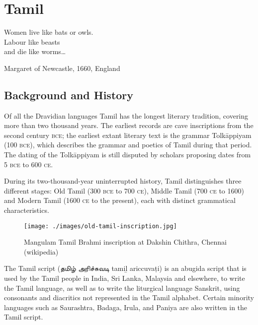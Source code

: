 \chapter{Tamil}

\epigraph{Women live like bats or owls.\\Labour like beasts\\and die like worms\ldots}{Margaret of Newcastle, 1660, England}



\label{s:tamil}
\newfontfamily{}

\def\tamiltext#1{{\tamil#1}}

\section{Background and History}

Of all the Dravidian languages Tamil has the longest literary tradition, covering
more than two thousand years. The earliest records are cave inscriptions from
the second century \textsc{bce}; the earliest extant literary text is the grammar
Tolkāppiyam (100 \textsc{bce}), which describes the grammar and poetics of Tamil during
that period. The dating of the Tolkāppiyam is still disputed by scholars proposing dates from
5 \textsc{bce} to 600 \textsc{ce}. 

During its two-thousand-year uninterrupted history, Tamil distinguishes
three different stages: Old Tamil (300 \textsc{bce} to 700 \textsc{ce}), Middle Tamil (700
\textsc{ce} to 1600) and Modern Tamil (1600 \textsc{ce} to the present), each with distinct
grammatical characteristics.


\begin{figure}[htbp]
\bgroup
\parindent=0pt
\centering
\texttt{[image: ./images/old-tamil-inscription.jpg]}

\caption{Mangulam Tamil Brahmi inscription at Dakshin Chithra, Chennai (wikipedia)}

\egroup
\end{figure}

The Tamil script (\tamiltext{தமிழ் அரிச்சுவடி} tamiḻ ariccuvaṭi) is an abugida script that is used by the Tamil people in India, Sri Lanka, Malaysia and elsewhere, to write the Tamil language, as well as to write the liturgical language Sanskrit, using consonants and diacritics not represented in the Tamil alphabet. Certain minority languages such as Saurashtra, Badaga, Irula, and Paniya are also written in the Tamil script. 

